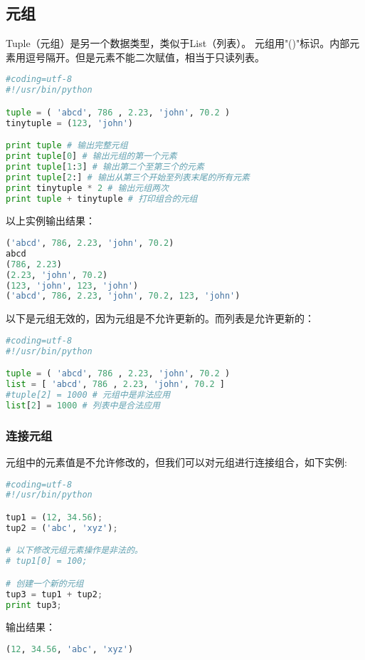 \subsection{元组}
Tuple（元组）是另一个数据类型，类似于List（列表）。
元组用"()"标识。内部元素用逗号隔开。但是元素不能二次赋值，相当于只读列表。
\begin{lstlisting}[language=Python]
#coding=utf-8
#!/usr/bin/python

tuple = ( 'abcd', 786 , 2.23, 'john', 70.2 )
tinytuple = (123, 'john')

print tuple # 输出完整元组
print tuple[0] # 输出元组的第一个元素
print tuple[1:3] # 输出第二个至第三个的元素 
print tuple[2:] # 输出从第三个开始至列表末尾的所有元素
print tinytuple * 2 # 输出元组两次
print tuple + tinytuple # 打印组合的元组
\end{lstlisting}
以上实例输出结果：
\begin{lstlisting}[language=Python]
('abcd', 786, 2.23, 'john', 70.2)
abcd
(786, 2.23)
(2.23, 'john', 70.2)
(123, 'john', 123, 'john')
('abcd', 786, 2.23, 'john', 70.2, 123, 'john')
\end{lstlisting}
以下是元组无效的，因为元组是不允许更新的。而列表是允许更新的：
\begin{lstlisting}[language=Python]
#coding=utf-8
#!/usr/bin/python

tuple = ( 'abcd', 786 , 2.23, 'john', 70.2 )
list = [ 'abcd', 786 , 2.23, 'john', 70.2 ]
#tuple[2] = 1000 # 元组中是非法应用
list[2] = 1000 # 列表中是合法应用
\end{lstlisting}


\subsubsection{连接元组}
元组中的元素值是不允许修改的，但我们可以对元组进行连接组合，如下实例:
\begin{lstlisting}[language=Python]
#coding=utf-8
#!/usr/bin/python

tup1 = (12, 34.56);
tup2 = ('abc', 'xyz');

# 以下修改元组元素操作是非法的。
# tup1[0] = 100;

# 创建一个新的元组
tup3 = tup1 + tup2;
print tup3;
\end{lstlisting}
输出结果：
\begin{lstlisting}[language=Python]
(12, 34.56, 'abc', 'xyz')
\end{lstlisting}


